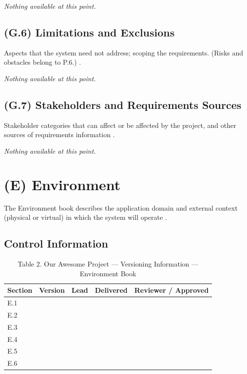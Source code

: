 \documentclass[12pt,letterpaper]{article}
\begin{document}
\textit{Nothing available at this point.}

\subsection{(G.6) Limitations and Exclusions}
Aspects that the system need not address; scoping the requirements. (Risks and obstacles belong to P.6.) \cite{meyer2022}.

\textit{Nothing available at this point.}

\subsection{(G.7) Stakeholders and Requirements Sources}
Stakeholder categories that can affect or be affected by the project, and other sources of requirements information \cite{meyer2022}.

\textit{Nothing available at this point.}

\clearpage

\section{(E) Environment}
The Environment book describes the application domain and external context (physical or virtual) in which the system will operate \cite{meyer2022}.

\subsection*{Control Information}
\begin{table}[h!]\centering
\caption*{Table 2. Our Awesome Project --- Versioning Information --- Environment Book}
\renewcommand{\arraystretch}{1.1}
\begin{tabularx}{\textwidth}{@{}l l l l l@{}}
\toprule
\textbf{Section} & \textbf{Version} & \textbf{Lead} & \textbf{Delivered} & \textbf{Reviewer / Approved} \\
\midrule
E.1 & & & & \\
E.2 & & & & \\
E.3 & & & & \\
E.4 & & & & \\
E.5 & & & & \\
E.6 & & & & \\
\bottomrule
\end{tabularx}
\end{table}
\end{document}
